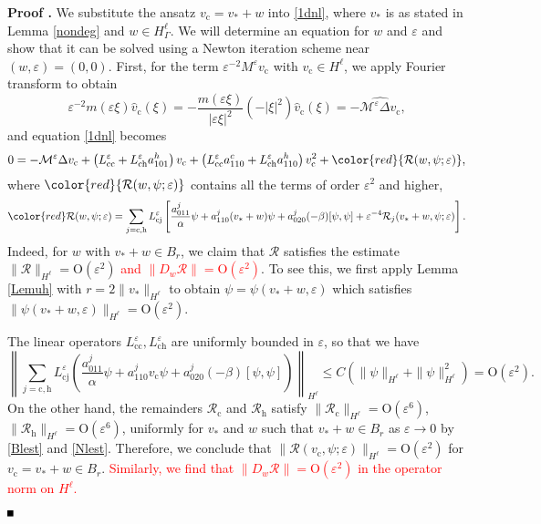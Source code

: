 \documentclass[10pt]{article}
\newenvironment{Proof}[1][\unskip]%
 {\begin{trivlist} \item[]{\bf Proof #1. }}%
 {\hspace*{\fill}$\rule{.4\baselineskip}{.4\baselineskip}$\end{trivlist}}
\newcommand{\rmO}{\mathrm{O}}
\newcommand{\eps}{\varepsilon}
\newcommand{\M}{\mathcal{M}}
\newcommand{\Rm}{\mathcal{R}}
\begin{document}
\begin{Proof}
We substitute the ansatz $v_\mathrm{c} = v_* + w$ into \eqref{1dnl}, where $v_*$ is as stated in Lemma \ref{nondeg} and $w \in H^\ell_{\Gamma}$. We will determine an equation for $w$ and $\eps$ and show that it can be solved using a Newton iteration scheme near $(w,\eps)=(0,0)$.
First, for the term $\eps^{-2}M^\eps v_\mathrm{c}$ with $v_\mathrm{c} \in H^\ell$, we apply Fourier transform to obtain
\[
\eps^{-2}m(\eps\xi)\widehat{v}_\mathrm{c}(\xi) = -\frac{m(\eps\xi)}{|\eps\xi|^2}(-|\xi|^2)\widehat{v}_\mathrm{c}(\xi) = -\widehat{\M^\eps \Delta v_\mathrm{c}},
\]
and equation \eqref{1dnl} becomes
\[
0 = -\M^\eps \Delta v_\mathrm{c} + \left(L_\mathrm{cc}^\eps +L_\mathrm{ch}^\eps a_{101}^h\right)v_\mathrm{c}+\left(L_\mathrm{cc}^\eps a_{110}^c+L_\mathrm{ch}^\eps a_{110}^h\right)v_\mathrm{c}^2 + \color{red}{\Rm(w,\psi;\eps)},
\]
where $\color{red}{\Rm(w,\psi;\eps)}$ contains all the terms of order $\eps^2$ and higher,
\[
\color{red}\Rm(w,\psi;\eps) =\sum_{j=\mathrm{c,h}} L_\mathrm{cj}^\eps\left[ \frac{a_{011}^j}{\alpha}\psi+a_{110}^j (v_*+w)\psi+a_{020}^j (-\beta)[\psi,\psi]+\eps^{-4}\Rm_j(v_*+w,\psi;\eps)\right].
\]
Indeed, for $w$ with $v_*+w \in B_r$, we claim that $\Rm$ satisfies the estimate $\|\Rm\|_{H^\ell} = \rmO(\eps^2)$ \textcolor{red} {and $\|D_w\Rm\|=\rmO(\eps^2)$}.  To see this, we first apply Lemma \ref{Lemuh} with $r = 2\|v_*\|_{H^\ell}$ to obtain $\psi = \psi(v_*+w,\eps)$ which satisfies $\|\psi(v_*+w,\eps)\|_{H^\ell} = \rmO(\eps^2)$.   

The linear operators $L_\mathrm{cc}^\eps, L_\mathrm{ch}^\eps$ are uniformly bounded in $\eps$, so that we have
\[
\left\|\sum_{j=\mathrm{c,h}} L_\mathrm{cj}^\eps\left( \frac{a_{011}^j}{\alpha}\psi+a_{110}^j v_\mathrm{c}\psi+a_{020}^j (-\beta)[\psi,\psi]\right)\right\|_{H^\ell} \le C(\|\psi\|_{H^\ell}+\|\psi\|_{H^\ell}^2) = \rmO(\eps^2).
\]
On the other hand, the remainders $\Rm_\mathrm{c}$ and $\Rm_\mathrm{h}$ satisfy $\|\Rm_\mathrm{c}\|_{H^\ell}= \rmO(\eps^6)$, $\|\Rm_\mathrm{h}\|_{H^\ell} = \rmO(\eps^6)$, uniformly for $v_*$ and $w$ such that $v_* +w \in B_r$ as $\eps \to 0$ by  \eqref{Blest} and \eqref{Nlest}. Therefore, we conclude that $\|\Rm(v_\mathrm{c},\psi;\eps)\|_{H^\ell} = \rmO(\eps^2)$ for $v_\mathrm{c}=v_*+w \in B_r$. \textcolor{red}{ Similarly, we find that $\|D_{w}\Rm\|=\rmO(\eps^2)$ in the operator norm on $H^\ell$.}
 

\end{Proof}
\end{document}
